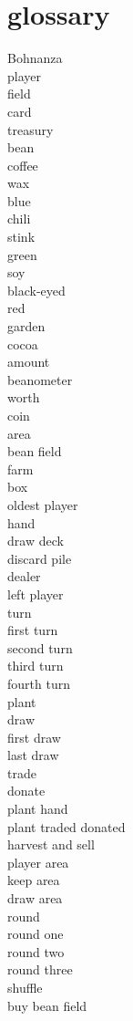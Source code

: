 \section{glossary}

\begin{description}
\item[Bohnanza]
\item[player]
\item[field]
\item[card]
\item[treasury]
\item[bean]
\item[coffee]
\item[wax]
\item[blue]
\item[chili]
\item[stink]
\item[green]
\item[soy]
\item[black-eyed]
\item[red]
\item[garden]
\item[cocoa]
\item[amount]
\item[beanometer]
\item[worth]
\item[coin]
\item[area]
\item[bean field]
\item[farm]
\item[box]
\item[oldest player]
\item[hand]
\item[draw deck]
\item[discard pile]
\item[dealer]
\item[left player]
\item[turn]
\item[first turn]
\item[second turn]
\item[third turn]
\item[fourth turn]
\item[plant]
\item[draw]
\item[first draw]
\item[last draw]
\item[trade]
\item[donate]
\item[plant hand]
\item[plant traded donated]
\item[harvest and sell]
\item[player area]
\item[keep area]
\item[draw area]
\item[round]
\item[round one]
\item[round two]
\item[round three]
\item[shuffle]
\item[buy bean field]
\end{description}